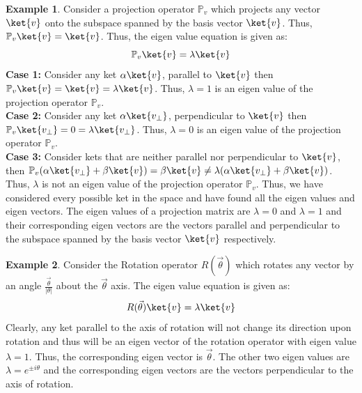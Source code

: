 \documentclass[12pt, oneside]{book}
\theoremstyle{definition}
\theoremstyle{definition}
\newtheorem{example}{Example}[section]
\theoremstyle{remark}
\begin{document}
\begin{example}
    Consider a projection operator $\mathbb{P}_v$ which projects any vector $\ket{v}$ onto the subspace spanned by the basis vector $\ket{v}$. Thus, $\mathbb{P}_v\ket{v}=\ket{v}$. Thus, the eigen value equation is given as:
    \[\mathbb{P}_v\ket{v}=\lambda\ket{v}\]
    \textbf{Case 1:} Consider any ket $\alpha \ket{v}$, parallel to $\ket{v}$ then $\mathbb{P}_v\ket{v}=\ket{v}=\lambda\ket{v}$. Thus, $\lambda=1$ is an eigen value of the projection operator $\mathbb{P}_v$.\\
    \textbf{Case 2:} Consider any ket $\alpha \ket{v_{\perp}}$, perpendicular to $\ket{v}$ then $\mathbb{P}_v\ket{v_{\perp}}=0=\lambda\ket{v_{\perp}}$. Thus, $\lambda=0$ is an eigen value of the projection operator $\mathbb{P}_v$.\\
    \textbf{Case 3:} Consider kets that are neither parallel nor perpendicular to $\ket{v}$, then $\mathbb{P}_v(\alpha \ket{v_{\perp}}+\beta \ket{v})=\beta \ket{v} \neq \lambda(\alpha \ket{v_{\perp}} + \beta \ket{v})$. Thus, $\lambda$ is not an eigen value of the projection operator $\mathbb{P}_v$.
    Thus, we have considered every possible ket in the space and have found all the eigen values and eigen vectors. The eigen values of a projection matrix
    are $\lambda=0$ and $\lambda=1$ and their corresponding eigen vectors are the vectors parallel and perpendicular to the subspace spanned by the basis vector $\ket{v}$ respectively.
\end{example}

\begin{example}
    Consider the Rotation operator $R(\vec{\theta})$ which rotates any vector by an angle $\frac{\vec{\theta}}{|\theta|}$ about the $\vec{\theta}$ axis.
    The eigen value equation is given as:
    \[R(\vec{\theta})\ket{v}=\lambda\ket{v}\]
    Clearly, any ket parallel to the axis of rotation will not change its direction upon rotation and thus will be an eigen vector of the rotation operator with eigen value $\lambda=1$. Thus, 
    the corresponding eigen vector is $\vec{\theta}$. 
    The other two eigen values are $\lambda=e^{\pm i\theta}$ and the corresponding eigen vectors are the vectors perpendicular to the axis of rotation.
\end{example}
\end{document}
